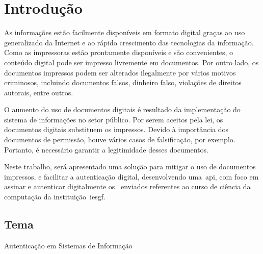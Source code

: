 \chapter{Introdução}\label{ch:introducao}

As informações estão facilmente disponíveis em formato digital graças ao uso
generalizado da Internet e ao rápido crescimento das tecnologias da informação.
Como as impressoras estão prontamente disponíveis e são convenientes, o conteúdo
digital pode ser impresso livremente em documentos.
Por outro lado, os documentos impressos podem ser alterados ilegalmente por
vários motivos criminosos, incluindo documentos falsos, dinheiro falso,
violações de direitos autorais, entre outros\cite{tsai2019}.

O aumento do uso de documentos digitais é resultado da implementação do
sistema de informações no setor público.
Por serem aceitos pela lei, os documentos digitais substituem os impressos.
Devido à importância dos documentos de permissão, houve vários casos de
falsificação, por exemplo.
Portanto, é necessário garantir a legitimidade desses documentos\cite{
    arief2019}.

Neste trabalho, será apresentado uma solução para mitigar o uso de documentos
impressos, e facilitar a autenticação digital, desenvolvendo uma~\acrfull{api},
com foco em assinar e autenticar digitalmente os~ enviados
referentes ao curso de ciência da computação da instituição~\acrlong{iesgf}.
\section{Tema}\label{sec:tema}
Autenticação em Sistemas de Informação



